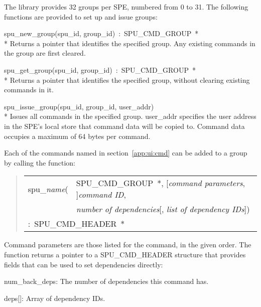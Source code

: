 The library provides 32 groups per SPE, numbered from 0 to 31. The following functions are provided to set up and issue groups:

\begin{description}
\item \textsf{spu\_new\_group(spu\_id, group\_id)~:~SPU\_CMD\_GROUP~*} \\*
Returns a pointer that identifies the specified group. Any existing commands in the group are first cleared.

\item \textsf{spu\_get\_group(spu\_id, group\_id)~:~SPU\_CMD\_GROUP~*} \\*
Returns a pointer that identifies the specified group, without clearing existing commands in it.

\item \textsf{spu\_issue\_group(spu\_id, group\_id, user\_addr)} \\*
Issues all commands in the specified group. \textsf{user\_addr} specifies the user address in the SPE's local store that command data will be copied to. Command data occupies a maximum of 64 bytes per command.

\end{description}

Each of the commands named in section~\ref{app:ui:cmd} can be added to a group by calling the function:
\begin{quote}
\begin{sffamily}
\begin{tabular}{l@{}l}
spu\_\emph{name}(&SPU\_CMD\_GROUP~*, [\emph{command parameters}, ]\emph{command ID},\\
&\emph{number of dependencies}[, \emph{list of dependency IDs}])\\
\multicolumn{2}{l}{:~SPU\_CMD\_HEADER~*}
\end{tabular}
\end{sffamily}
\end{quote}
Command parameters are those listed for the command, in the given order. The function returns a pointer to a \textsf{SPU\_CMD\_HEADER} structure that provides fields that can be used to set dependencies directly:
\begin{description}
\item \textsf{num\_back\_deps}: The number of dependencies this command has.
\item \textsf{deps[]}: Array of dependency IDs.
\end{description}

